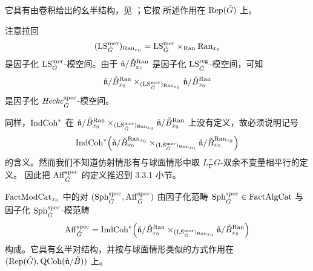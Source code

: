 它具有由卷积给出的幺半结构，见 \cite[附录 E.6]{ABC+24a}；它按 \cite[附录 E.7]{ABC+24a}
所述作用在 $\mathrm{Rep}(\check G)$ 上。

注意拉回
\[
(\mathrm{LS}^{\mathrm{mer}}_{\check G})_{\mathrm{Ran}_{x_0}}
=\mathrm{LS}^{\mathrm{mer}}_{\check G}\times_{\mathrm{Ran}}\mathrm{Ran}_{x_0}
\]
是因子化 $\mathrm{LS}^{\mathrm{mer}}_{\check G}$-模空间。由于 $\check{\mathfrak{n}}/\check B^{\mathrm{Ran}}_{x_0}$
是因子化 $\mathrm{LS}^{\mathrm{reg}}_{\check G}$-模空间，可知
\[
\check{\mathfrak{n}}/\check B^{\mathrm{Ran}}_{x_0}
\times_{(\mathrm{LS}^{\mathrm{mer}}_{\check G})_{\mathrm{Ran}_{x_0}}}
\check{\mathfrak{n}}/\check B^{\mathrm{Ran}}_{x_0}
\]
是因子化 $\mathit{Hecke}^{\mathrm{spec}}_{\check G}$-模空间。

同样，$\mathrm{IndCoh}^{*}$ 在
$\check{\mathfrak{n}}/\check B^{\mathrm{Ran}}_{x_0}
\times_{(\mathrm{LS}^{\mathrm{mer}}_{\check G})_{\mathrm{Ran}_{x_0}}}
\check{\mathfrak{n}}/\check B^{\mathrm{Ran}}_{x_0}$ 上没有定义，故必须说明记号
\[
\mathrm{IndCoh}^{*}\Bigl(\check{\mathfrak{n}}/\check B^{\mathrm{Ran}_{x_0}}_{x_0}
\times_{(\mathrm{LS}^{\mathrm{mer}}_{\check G})_{\mathrm{Ran}_{x_0}}}
\check{\mathfrak{n}}/\check B^{\mathrm{Ran}_{x_0}}_{x_0}\Bigr)
\]
的含义。然而我们不知道仿射情形有与球面情形中取 $L^+_\nabla G$-双余不变量相平行的定义。
因此把 $\mathrm{Aff}^{\mathrm{spec}}_{\check G}$ 的定义推迟到 3.3.1 小节。

\begin{definition}
\label{def:aff-spec-prelim}
$\mathrm{FactModCat}_{x_0}$ 中的对 $(\mathrm{Sph}^{\mathrm{spec}}_{\check G},\mathrm{Aff}^{\mathrm{spec}}_{\check G})$ 由因子化范畴
$\mathrm{Sph}^{\mathrm{spec}}_{\check G}\in \mathrm{FactAlgCat}$ 与因子化 $\mathrm{Sph}^{\mathrm{spec}}_{\check G}$-模范畴
\[
\mathrm{Aff}^{\mathrm{spec}}_{\check G}
=\mathrm{IndCoh}^{*}\Bigl(\check{\mathfrak{n}}/\check B^{\mathrm{Ran}}_{x_0}
\times_{(\mathrm{LS}^{\mathrm{mer}}_{\check G})_{\mathrm{Ran}_{x_0}}}
\check{\mathfrak{n}}/\check B^{\mathrm{Ran}}_{x_0}\Bigr)
\]
构成。它具有幺半对结构，并按与球面情形类似的方式作用在
$(\mathrm{Rep}(\check G),\mathrm{QCoh}(\check{\mathfrak{n}}/\check B))$ 上。
\end{definition}
